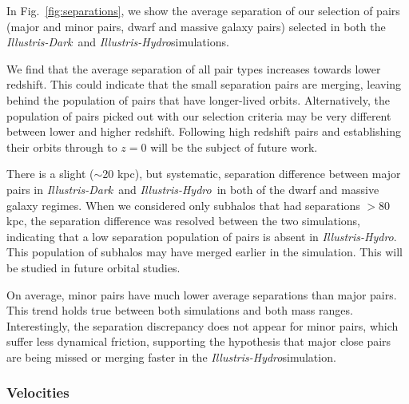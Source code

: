 \documentclass[twocolumn]{aastex63}
\newcommand\ID{\textit{Illustris-Dark}}
\newcommand\IH{\textit{Illustris-Hydro}}
\begin{document}
In Fig.~\ref{fig:separations}, we show the average separation of our selection of pairs (major and minor pairs, dwarf and massive galaxy pairs) selected in both the \ID\ and \IH simulations. 

We find that the average separation of all pair types increases towards lower redshift. This could indicate that the small separation pairs are merging, leaving behind the population of pairs that have longer-lived orbits. Alternatively, the population of pairs picked out with our selection criteria may be very different between lower and higher redshift. Following high redshift pairs and establishing their orbits through to $z=0$ will be the subject of future work. 

There is a slight ($\sim$20 kpc), but systematic, separation difference between major pairs in \ID\ and \IH\ in both of the dwarf and massive galaxy regimes. When we considered only subhalos that had separations $> 80$ kpc, the separation difference was resolved between the two simulations, indicating that a low separation population of pairs is absent in \IH. This population of subhalos may have merged earlier in the simulation. This will be studied in future orbital studies.

On average, minor pairs have much lower average separations than major pairs. This trend holds true between both simulations and both mass ranges. Interestingly, the separation discrepancy does not appear for minor pairs, which suffer less dynamical friction, supporting the hypothesis that major close pairs are being missed or merging faster in the \IH simulation.

\subsubsection{Velocities}
\end{document}
